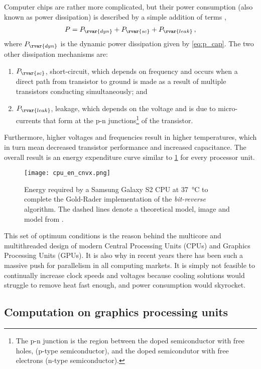 Computer chips are rather more complicated, but their power consumption (also known as power dissipation) is described by a simple addition of terms \cite{cpu_pow},
\begin{align}
  P = P_{\rvar{dyn}} + P_{\rvar{sc}} + P_{\rvar{leak}}\,,
\end{align}
where $ P_{\rvar{dyn}} $ is the dynamic power dissipation given by \cref{eq:p_cap}. The two other dissipation mechanisms are:
\begin{enumerate}
  \item $P_{\rvar{sc}}$, short-circuit, which depends on frequency and occurs when a direct path from transistor to ground is made as a result of multiple transistors conducting simultaneously; and
  \item $P_{\rvar{leak}}$, leakage, which depends on the voltage and is due to micro-currents that form at the p-n junctions\footnote{The p-n junction is the region between the doped semiconductor with free holes, (p-type semiconductor), and the doped semicondutor with free electrons (n-type semiconductor).} of the transistor.
\end{enumerate}
Furthermore, higher voltages and frequencies result in higher temperatures, which in turn mean decreased transistor performance and increased capacitance. The overall result is an energy expenditure curve similar to \cref{f:cpu_en_cnvx} \cite{cpu_en_cnvx} for every processor unit.
\begin{figure}[t]
  \centering
  \texttt{[image: cpu\_en\_cnvx.png]}
  \caption[Energy expenditure of CPU vs Voltage.]{Energy required by a Samsung Galaxy S2 CPU at \SI{37}{\degreeCelsius} to complete the Gold-Rader implementation of the \emph{bit-reverse} algorithm. The dashed lines denote a theoretical model, image and model from \cite{cpu_en_cnvx}.}
  \label{f:cpu_en_cnvx}
\end{figure}

This set of optimum conditions is the reason behind the multicore and multithreaded design of modern Central Processing Units (CPUs) and Graphics Processing Units (GPUs). It is also why in recent years there has been such a massive push for parallelism in all computing markets. It is simply not feasible to continually increase clock speeds and voltages because cooling solutions would struggle to remove heat fast enough, and power consumption would skyrocket.

\subsection{Computation on graphics processing units}
\label{sc:compgpu}

